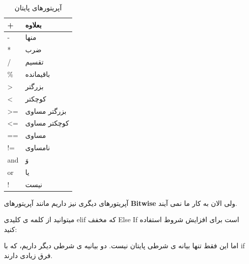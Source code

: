\documentclass[14pt,a4paper]{memoir}
\begin{document}
	\begin{table}[H]\label{pyop}
		\centering
		\begin{tabular}{|l|l|}
			\hline
			+               & بعلاوه       \\ \hline
			-               & منها         \\ \hline
			*               & ضرب          \\ \hline
			/               & تقسیم        \\ \hline
			\%              & باقیمانده    \\ \hline
			\textgreater{}  & بزرگتر       \\ \hline
			\textless{}     & کوچکتر       \\ \hline
			\textgreater{}= & بزرگتر مساوی \\ \hline
			\textless{}=    & کوچکتر مساوی \\ \hline
			==              & مساوی        \\ \hline
			!=              & نامساوی     \\ \hline
			and             & وَ           \\ \hline
			or              & یا           \\ \hline
			!				& نیست \\ \hline
		\end{tabular}
		\caption{آپریتورهای پایتان}
	\end{table}
			


	 
	 
	 آپریتورهای دیگری نیز داریم مانند آپریتورهای \textbf{Bitwise} ولی الان به کار ما نمی آیند.
	 
	 میتوانید از کلمه ی کلیدی elif که مخفف Else If است برای افزایش شروط استفاده کنید:
	 
	 
	 \begin{latin}
	 
\end{latin}

اما این فقط تنها بیانه ی شرطی پایتان نیست. دو بیانیه ی شرطی دیگر داریم، که با if فرق زیادی دارند.
\end{document}
